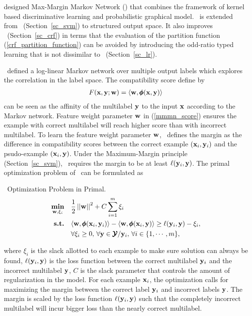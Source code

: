 {\citet{Taskar04max} designed Max-Margin Markov Network (\mmmn) that combines the framework of kernel based discriminative learning and probabilistic graphical model.
\mmmn\ is extended from \svm\ (Section~\ref{sc_svm}) to structured output space.
It also improves \crf\ (Section~\ref{sc_crf}) in terms that the evaluation of the partition function (\ref{crf_partition_function}) can be avoided by introducing the odd-ratio typed learning that is not dissimilar to \lr\ (Section~\ref{sc_lr}).

\mmmn\ defined a log-linear Markov network over multiple output labels which explores the correlation in the label space.
The compatibility score define by 
\begin{align}
	F(\mathbf {x},\mathbf {y};\mathbf {w}) = \langle \mathbf {w}, \pmb \phi(\mathbf {x},\mathbf {y}) \rangle \label{mmmn_score}
\end{align}
can be seen as the affinity of the multilabel $\mathbf {y}$ to the input $\mathbf {x}$ according to the Markov network.
Feature weight parameter $\mathbf {w}$ in (\ref{mmmn_score}) ensures the example with correct multilabel will reach higher score than with incorrect multilabel.
To learn the feature weight parameter $\mathbf {w}$, \mmmn\ defines the margin as the difference in compatibility scores between the correct example $(\mathbf {x}_i,\mathbf {y}_i)$ and the psudo-example $(\mathbf {x}_i,\mathbf {y})$.
Under the Maximum-Margin principle (Section~\ref{sc_svm}), \mmmn\ requires the margin to be at least $\mathbf {\ell}(\mathbf {y}_i,{\mathbf {y}})$.
The primal optimization problem of \mmmn\ can be formulated as
\begin{definition}{\mmmn\ Optimization Problem in Primal.}\label{def_mmmn}
	\begin{align*}
		\underset{\mathbf {w},\mathbf{\xi}_i}{\textbf{min}} & \quad\frac{1}{2}\left|\left| \mathbf {w} \right|\right|^2 + C\sum_{i=1}^{m}\xi_i \\
		\textbf{s.t.} & \quad\langle \mathbf {w}, \pmb \phi(\mathbf {x}_i,\mathbf {y}_i) \rangle - \langle \mathbf {w}, \pmb \phi(\mathbf {x}_i,\mathbf {y}) \rangle \ge \mathbf {\ell}(\mathbf {y}_i,\mathbf {y})-\xi_i,\\
		& \quad \forall \xi_i\ge0,\, \forall \mathbf {y}\in\pmb {\mathcal{Y}}/\mathbf {y}_i,\, \forall i\in\{1,\cdots,m\},
	\end{align*}
\end{definition}
where $\xi_i$ is the slack allotted to each example to make sure solution can always be found, $\mathbf {\ell}(\mathbf {y}_i,\mathbf {y})$ is the loss function between the correct multilabel $\mathbf {y}_i$ and the incorrect multilabel $\mathbf {y}$, $C$ is the slack parameter that controls the amount of regularization in the model.
For each example $\mathbf {x}_i$, the optimization calls for maximizing the margin between the correct label $\mathbf {y}_i$ and incorrect labels $\mathbf {y}$.
The margin is scaled by the loss function $\mathbf {\ell}(\mathbf {y}_i,{\mathbf {y}})$ such that the completely incorrect multilabel will incur bigger loss than the nearly correct multilabel.


}
